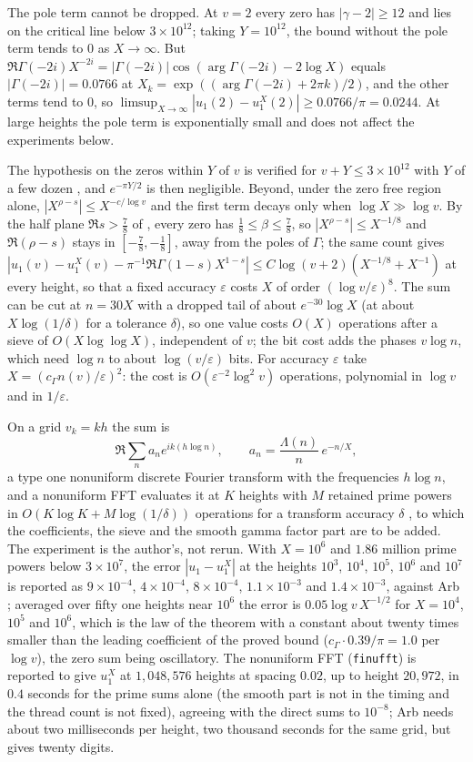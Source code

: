 The pole term cannot be dropped. At $v=2$ every zero has $|\gamma-2|\ge12$ and lies on the critical line below $3\times10^{12}$; taking $Y=10^{12}$, the bound without the pole term tends to $0$ as $X\to\infty$. But $\Re\Gamma(-2i)X^{-2i}=|\Gamma(-2i)|\cos(\arg\Gamma(-2i)-2\log X)$ equals $|\Gamma(-2i)|=0.0766$ at $X_k=\exp((\arg\Gamma(-2i)+2\pi k)/2)$, and the other terms tend to $0$, so $\limsup_{X\to\infty}|u_1(2)-u_1^X(2)|\ge0.0766/\pi=0.0244$. At large heights the pole term is exponentially small and does not affect the experiments below.

The hypothesis on the zeros within $Y$ of $v$ is verified for $v+Y\le3\times10^{12}$ with $Y$ of a few dozen \cite{PT21}, and $e^{-\pi Y/2}$ is then negligible. Beyond, under the zero free region alone, $|X^{\rho-s}|\le X^{-c/\log v}$ and the first term decays only when $\log X\gg\log v$. By the half plane $\Re s>\tfrac78$ of \cite{OAI26a}, every zero has $\tfrac18\le\beta\le\tfrac78$, so $|X^{\rho-s}|\le X^{-1/8}$ and $\Re(\rho-s)$ stays in $[-\tfrac78,-\tfrac18]$, away from the poles of $\Gamma$; the same count gives $|u_1(v)-u_1^X(v)-\pi^{-1}\Re\Gamma(1-s)X^{1-s}|\le C\log(v+2)(X^{-1/8}+X^{-1})$ at every height, so that a fixed accuracy $\varepsilon$ costs $X$ of order $(\log v/\varepsilon)^8$. The sum can be cut at $n=30X$ with a dropped tail of about $e^{-30}\log X$ (at about $X\log(1/\delta)$ for a tolerance $\delta$), so one value costs $O(X)$ operations after a sieve of $O(X\log\log X)$, independent of $v$; the bit cost adds the phases $v\log n$, which need $\log n$ to about $\log(v/\varepsilon)$ bits. For accuracy $\varepsilon$ take $X=(c_\Gamma n(v)/\varepsilon)^2$: the cost is $O(\varepsilon^{-2}\log^2v)$ operations, polynomial in $\log v$ and in $1/\varepsilon$.

On a grid $v_k=kh$ the sum is
\[
\Re\sum_na_ne^{ik(h\log n)},\qquad a_n=\frac{\Lambda(n)}n\,e^{-n/X},
\]
a type one nonuniform discrete Fourier transform with the frequencies $h\log n$, and a nonuniform FFT evaluates it at $K$ heights with $M$ retained prime powers in $O(K\log K+M\log(1/\delta))$ operations for a transform accuracy $\delta$ \cite{FINUFFT19}, to which the coefficients, the sieve and the smooth gamma factor part are to be added. The experiment is the author's, not rerun. With $X=10^6$ and $1.86$ million prime powers below $3\times10^7$, the error $|u_1-u_1^X|$ at the heights $10^3$, $10^4$, $10^5$, $10^6$ and $10^7$ is reported as $9\times10^{-4}$, $4\times10^{-4}$, $8\times10^{-4}$, $1.1\times10^{-3}$ and $1.4\times10^{-3}$, against Arb \cite{Arb}; averaged over fifty one heights near $10^6$ the error is $0.05\log v\,X^{-1/2}$ for $X=10^4$, $10^5$ and $10^6$, which is the law of the theorem with a constant about twenty times smaller than the leading coefficient of the proved bound ($c_\Gamma\cdot0.39/\pi=1.0$ per $\log v$), the zero sum being oscillatory. The nonuniform FFT (\texttt{finufft}) is reported to give $u_1^X$ at $1{,}048{,}576$ heights at spacing $0.02$, up to height $20{,}972$, in $0.4$ seconds for the prime sums alone (the smooth part is not in the timing and the thread count is not fixed), agreeing with the direct sums to $10^{-8}$; Arb needs about two milliseconds per height, two thousand seconds for the same grid, but gives twenty digits.

